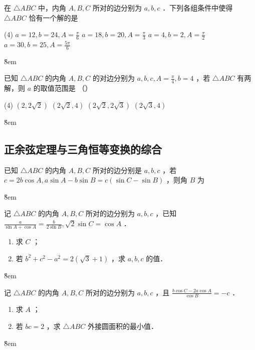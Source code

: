 \begin{example}
    在 $\triangle A B C$ 中，内角 $A, B, C$ 所对的边分别为 $a, b, c$ ．下列各组条件中使得 $\triangle A B C$ 恰有一个解的是
    \begin{tasks}(4)
        \task $a=12, b=24, A=\frac{\pi}{6}$
        \task $a=18, b=20, A=\frac{\pi}{3}$
        \task $a=4, b=2, A=\frac{\pi}{2}$
        \task $a=30, b=25, A=\frac{5 \pi}{6}$
    \end{tasks}
\end{example}
\v{8em}


\begin{example}
    已知 $\triangle A B C$ 的内角 $A, B, C$ 的对边分别为 $a, b, c, A=\frac{\pi}{4}, b=4$ ，若 $\triangle A B C$ 有两解，则 $a$ 的取值范围是 （\qquad）
    \begin{tasks}(4)
        \task $(2,2 \sqrt{2})$
        \task $(2 \sqrt{2}, 4)$
        \task $(2 \sqrt{2}, 2 \sqrt{3})$
        \task $(2 \sqrt{3}, 4)$
    \end{tasks}
\end{example}

\v{8em}

\subsection{正余弦定理与三角恒等变换的综合}

\begin{example}
    已知 $\triangle A B C$ 的内角 $A, B, C$ 所对的边分别是 $a, b, c$ ，若 $c=2 b \cos A, a \sin A-b \sin B=c(\sin C-\sin B)$ ，则角 $B$ 为
\end{example}
\v{8em}

\begin{example}
    记 $\triangle A B C$ 的内角 $A, B, C$ 所对的边分别为 $a, b, c$ ，已知 $\frac{a}{\sin A+\cos A}=\frac{b}{2 \sin B}, \sqrt{2} \sin C=\cos A$ ．
    \begin{enumerate}
        \item 求 $C$ ；
        \item 若 $b^2+c^2-a^2=2(\sqrt{3}+1)$ ，求 $a, b, c$ 的值．
    \end{enumerate}
\end{example}
\v{8em}

\begin{example}
    记 $\triangle A B C$ 的内角 $A, B, C$ 所对的边分别为 $a, b, c$ ，且 $\frac{b \cos C-2 a \cos A}{\cos B}=-c$ ．
    \begin{enumerate}
        \item 求 $A$ ；
        \item 若 $b c=2$ ，求 $\triangle A B C$ 外接圆面积的最小值．
    \end{enumerate}
\end{example}
\v{8em}

